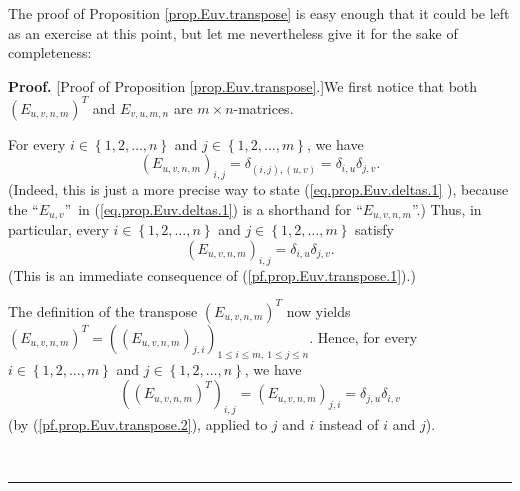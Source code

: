 \documentclass[numbers=enddot,12pt,final,onecolumn,notitlepage]{scrartcl}%
\theoremstyle{definition}
\newenvironment{proof}[1][Proof]{\noindent\textbf{#1.} }{\ \rule{0.5em}{0.5em}}
\begin{document}
The proof of Proposition \ref{prop.Euv.transpose} is easy enough that it could
be left as an exercise at this point, but let me nevertheless give it for the
sake of completeness:

\begin{proof}
[Proof of Proposition \ref{prop.Euv.transpose}.]We first notice that both
$\left(  E_{u,v,n,m}\right)  ^{T}$ and $E_{v,u,m,n}$ are $m\times n$-matrices.

For every $i\in\left\{  1,2,\ldots,n\right\}  $ and $j\in\left\{
1,2,\ldots,m\right\}  $, we have%
\begin{equation}
\left(  E_{u,v,n,m}\right)  _{i,j}=\delta_{\left(  i,j\right)  ,\left(
u,v\right)  }=\delta_{i,u}\delta_{j,v}. \label{pf.prop.Euv.transpose.1}%
\end{equation}
(Indeed, this is just a more precise way to state (\ref{eq.prop.Euv.deltas.1}%
), because the \textquotedblleft$E_{u,v}$\textquotedblright\ in
(\ref{eq.prop.Euv.deltas.1}) is a shorthand for \textquotedblleft$E_{u,v,n,m}%
$\textquotedblright.) Thus, in particular, every $i\in\left\{  1,2,\ldots
,n\right\}  $ and $j\in\left\{  1,2,\ldots,m\right\}  $ satisfy%
\begin{equation}
\left(  E_{u,v,n,m}\right)  _{i,j}=\delta_{i,u}\delta_{j,v}.
\label{pf.prop.Euv.transpose.2}%
\end{equation}
(This is an immediate consequence of (\ref{pf.prop.Euv.transpose.1}).)

The definition of the transpose $\left(  E_{u,v,n,m}\right)  ^{T}$ now yields
$\left(  E_{u,v,n,m}\right)  ^{T}=\left(  \left(  E_{u,v,n,m}\right)
_{j,i}\right)  _{1\leq i\leq m,\ 1\leq j\leq n}$. Hence, for every
$i\in\left\{  1,2,\ldots,m\right\}  $ and $j\in\left\{  1,2,\ldots,n\right\}
$, we have%
\begin{equation}
\left(  \left(  E_{u,v,n,m}\right)  ^{T}\right)  _{i,j}=\left(  E_{u,v,n,m}%
\right)  _{j,i}=\delta_{j,u}\delta_{i,v} \label{pf.prop.Euv.transpose.3}%
\end{equation}
(by (\ref{pf.prop.Euv.transpose.2}), applied to $j$ and $i$ instead of $i$ and
$j$).


\end{proof}
\end{document}
